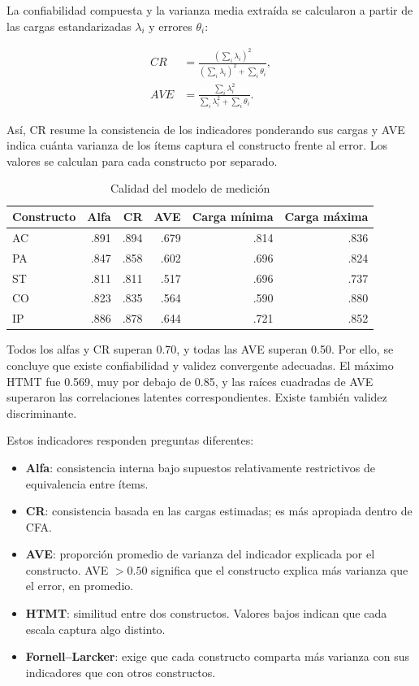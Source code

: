 \documentclass[11pt,letterpaper]{article}
\begin{document}
La confiabilidad compuesta y la varianza media extraída se calcularon a partir de las cargas estandarizadas $\lambda_i$ y errores $\theta_i$:

\begin{align}
CR&=\frac{(\sum_i\lambda_i)^2}{(\sum_i\lambda_i)^2+\sum_i\theta_i},\\
AVE&=\frac{\sum_i\lambda_i^2}{\sum_i\lambda_i^2+\sum_i\theta_i}.
\end{align}

Así, CR resume la consistencia de los indicadores ponderando sus cargas y AVE indica cuánta varianza de los ítems captura el constructo frente al error. Los valores se calculan para cada constructo por separado.

\begin{table}[H]
\centering
\caption{Calidad del modelo de medición}
\begin{tabular}{lrrrrr}
\toprule
Constructo & Alfa & CR & AVE & Carga mínima & Carga máxima\\
\midrule
AC & .891 & .894 & .679 & .814 & .836\\
PA & .847 & .858 & .602 & .696 & .824\\
ST & .811 & .811 & .517 & .696 & .737\\
CO & .823 & .835 & .564 & .590 & .880\\
IP & .886 & .878 & .644 & .721 & .852\\
\bottomrule
\end{tabular}
\end{table}

Todos los alfas y CR superan 0.70, y todas las AVE superan 0.50. Por ello, se concluye que existe confiabilidad y validez convergente adecuadas. El máximo HTMT fue 0.569, muy por debajo de 0.85, y las raíces cuadradas de AVE superaron las correlaciones latentes correspondientes. Existe también validez discriminante.

Estos indicadores responden preguntas diferentes:

\begin{itemize}
\item \textbf{Alfa}: consistencia interna bajo supuestos relativamente restrictivos de equivalencia entre ítems.
\item \textbf{CR}: consistencia basada en las cargas estimadas; es más apropiada dentro de CFA.
\item \textbf{AVE}: proporción promedio de varianza del indicador explicada por el constructo. AVE $>0.50$ significa que el constructo explica más varianza que el error, en promedio.
\item \textbf{HTMT}: similitud entre dos constructos. Valores bajos indican que cada escala captura algo distinto.
\item \textbf{Fornell--Larcker}: exige que cada constructo comparta más varianza con sus indicadores que con otros constructos.
\end{itemize}
\end{document}
